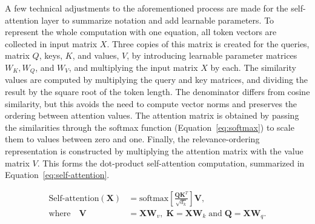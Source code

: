 \documentclass[english,twoside,openright]{UH_DS_MSc}
\begin{document}
A few technical adjustments to the aforementioned process are made for the self-attention layer to summarize notation and add learnable parameters. To represent the whole computation with one equation, all token vectors are collected in input matrix $X$. Three copies of this matrix is created for the queries, matrix $Q$, keys, $K$, and values, $V$, by introducing learnable parameter matrices $W_K, W_Q$, and $W_V$, and multiplying the input matrix $X$ by each. The similarity values are computed by multiplying the query and key matrices, and dividing the result by the square root of the token length. The denominator differs from cosine similarity, but this avoids the need to compute vector norms and preserves the ordering between attention values. The attention matrix is obtained by passing the similarities through the softmax function (Equation~\ref{eq:softmax}) to scale them to values between zero and one. Finally, the relevance-ordering representation is constructed by multiplying the attention matrix with the value matrix $V$. This forms the dot-product self-attention computation, summarized in Equation~\ref{eq:self-attention}.
 


\begin{align}
    \text{Self-attention}(\mathbf{X}) &= \text{softmax} \left[ \frac{\mathbf{Q}\mathbf{K}^T }{\sqrt{d_k}} \right] \mathbf{V}, \label{eq:self-attention} \\
    \nonumber\text{where} \quad \mathbf{V} &= \mathbf{X} \mathbf{W}_v, \; \mathbf{K} = \mathbf{X} \mathbf{W}_k \; \text{and} \; \mathbf{Q} = \mathbf{X} \mathbf{W}_q.
\end{align}
\end{document}
